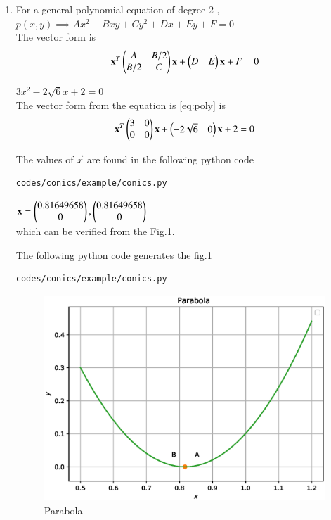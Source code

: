 \renewcommand{\theequation}{\theenumi}
\begin{enumerate}[label=\arabic*.,ref=\thesubsubsection.\theenumi]
\item For a general polynomial equation of degree 2 , \\
$p(x,y) \implies Ax^2+Bxy+Cy^2+Dx+Ey+F=0$ \\
The vector form is  
\begin{align}
\mathbf{x}^T\begin{pmatrix}A&B/2\\B/2&C\end{pmatrix}\mathbf{x}+\begin{pmatrix}D&E\end{pmatrix}\mathbf{x}+F=0 \label{eq:poly}
\end{align} 

$3x^2-2\sqrt{6}x+2 = 0$  \\
The vector form from the equation is \ref{eq:poly} is 
\begin{align}
\mathbf{x}^T\begin{pmatrix}3&0\\0&0\end{pmatrix}\mathbf{x}+\begin{pmatrix}-2\sqrt{6}&0\end{pmatrix}\mathbf{x}+2 = 0
\end{align}

The values of $\vec{x}$ are found in the following python code
\begin{lstlisting}
codes/conics/example/conics.py
\end{lstlisting}

$\mathbf{x}=\begin{pmatrix}0.81649658\\0\end{pmatrix}, \begin{pmatrix}0.81649658\\0\end{pmatrix}$ \\
which can be verified from the Fig.\ref{fig:parabola}. 

The following python code generates the fig.\ref{fig:parabola}
\begin{lstlisting}
codes/conics/example/conics.py
\end{lstlisting}
\begin{figure}[!ht]
\includegraphics[width=\columnwidth]{./codes/conics/example/conics.eps}
\caption{Parabola}
\label{fig:parabola}
\end{figure} 
\end{enumerate}